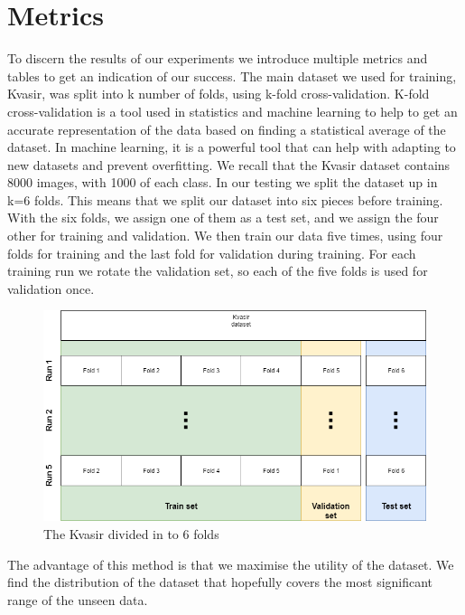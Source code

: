    
\FloatBarrier



\section{Metrics}
To discern the results of our experiments we introduce multiple metrics and tables to get an indication of our success. 
The main dataset we used for training, Kvasir, was split into k number of folds, using k-fold cross-validation. 
K-fold cross-validation is a tool used in statistics and machine learning to help to get an accurate representation of the data based on finding a statistical average of the dataset.  In machine learning, it is a powerful tool that can help with adapting to new datasets and prevent overfitting. 
We recall that the Kvasir dataset contains 8000 images, with 1000 of each class. 
In our testing we split the dataset up in k=6 folds. This means that we split our dataset into six pieces before training.  With the six folds, we assign one of them as a test set, and we assign the four other for training and validation. We then train our data five times, using four folds for training and the last fold for validation during training. For each training run we rotate the validation set, so each of the five folds is used for validation once. 

\begin{figure}[h]
\hspace*{-1cm}                                                           
\centering
\includegraphics[scale=0.4]{experiments/figures/KfoldKvasir_compressed.png}
\caption{The Kvasir divided in to 6 folds}
\label{fig:KfoldKvasir}
\end{figure}

The advantage of this method is that we maximise the utility of the dataset. We find the distribution of the dataset that hopefully covers the most significant range of the unseen data. 


